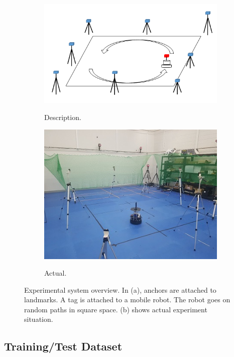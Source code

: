 \documentclass[letterpaper, 10 pt, conference]{ieeeconf}  %
\begin{document}
\begin{figure}[h]
	\centering
	\begin{subfigure}[b]{.25\textwidth}
		\centering
		\includegraphics[width=.9\textwidth]{descriptionSystem}
		\label{setting:sub1} 	
		\caption{Description.}
	\end{subfigure}%
	\begin{subfigure}[b]{.25\textwidth}
		\centering
		\includegraphics[width=.9\textwidth]{actualSystem}
		\label{setting:sub2} 	
		\caption{Actual.}
	\end{subfigure}
	\caption{Experimental system overview. In (a), anchors are attached to landmarks. A tag is attached to a mobile robot. The robot goes on random paths in square space. (b) shows actual experiment situation.}
	\label{setting}
\end{figure}

\subsection{Training/Test Dataset}
\end{document}

